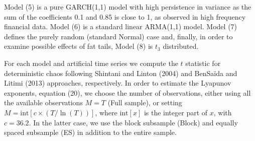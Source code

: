 \documentclass[12pt]{article}
\begin{document}
Model (5) is a pure GARCH(1,1) model with high persistence in variance as the sum of the coefficients 0.1 and 0.85 is close to 1, as observed in high frequency financial data.
Model (6) is a standard linear ARMA(1,1) model. Model (7) 
defines the purely random (standard Normal) case and, finally, in order to examine possible effects of fat tails, Model (8) is $t_3$ distributed.

For each model and artificial time series we compute the $t$ statistic for deterministic
chaos following Shintani and Linton (2004) and BenSa\"{i}da and Litimi (2013) approaches, respectively. In order to estimate the Lyapunov exponents, equation (20),
we choose the number of observations, either using all the available observations $M=T$ (Full sample), or setting $M=\text{int}[c\times(T/\ln(T))]$, where $\text{int}[x]$ is the integer part of $x$, with $c=36.2$. In the latter case, we use the block subsample (Block) and
equally spaced subsample (ES) in addition to the entire sample.
\end{document}
